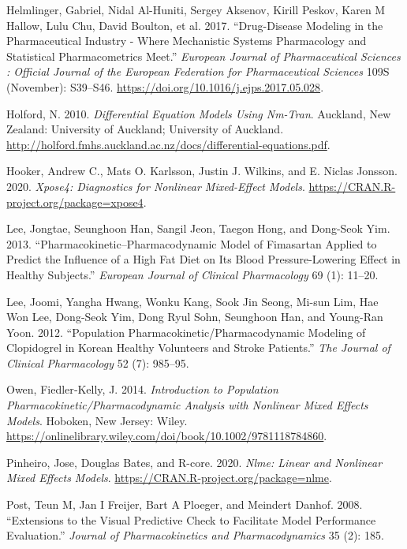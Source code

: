 \documentclass[
  10pt,
  krantz2,
  a4paper]{krantz}
\newlength{\cslhangindent}
\newenvironment{cslreferences}%
  {\setlength{\parindent}{0pt}%
  \everypar{\setlength{\hangindent}{\cslhangindent}}\ignorespaces}%
  {\par}
\theoremstyle{definition}
\theoremstyle{definition}
\theoremstyle{definition}
\theoremstyle{remark}
\begin{document}
\begin{cslreferences}
\leavevmode\hypertarget{ref-helmlinger2017drug}{}%
Helmlinger, Gabriel, Nidal Al-Huniti, Sergey Aksenov, Kirill Peskov, Karen M Hallow, Lulu Chu, David Boulton, et al. 2017. ``Drug-Disease Modeling in the Pharmaceutical Industry - Where Mechanistic Systems Pharmacology and Statistical Pharmacometrics Meet.'' \emph{European Journal of Pharmaceutical Sciences : Official Journal of the European Federation for Pharmaceutical Sciences} 109S (November): S39--S46. \url{https://doi.org/10.1016/j.ejps.2017.05.028}.

\leavevmode\hypertarget{ref-nickholford}{}%
Holford, N. 2010. \emph{Differential Equation Models Using Nm-Tran}. Auckland, New Zealand: University of Auckland; University of Auckland. \url{http://holford.fmhs.auckland.ac.nz/docs/differential-equations.pdf}.

\leavevmode\hypertarget{ref-R-xpose4}{}%
Hooker, Andrew C., Mats O. Karlsson, Justin J. Wilkins, and E. Niclas Jonsson. 2020. \emph{Xpose4: Diagnostics for Nonlinear Mixed-Effect Models}. \url{https://CRAN.R-project.org/package=xpose4}.

\leavevmode\hypertarget{ref-lee2013pharmacokinetic}{}%
Lee, Jongtae, Seunghoon Han, Sangil Jeon, Taegon Hong, and Dong-Seok Yim. 2013. ``Pharmacokinetic--Pharmacodynamic Model of Fimasartan Applied to Predict the Influence of a High Fat Diet on Its Blood Pressure-Lowering Effect in Healthy Subjects.'' \emph{European Journal of Clinical Pharmacology} 69 (1): 11--20.

\leavevmode\hypertarget{ref-lee2012population}{}%
Lee, Joomi, Yangha Hwang, Wonku Kang, Sook Jin Seong, Mi-sun Lim, Hae Won Lee, Dong-Seok Yim, Dong Ryul Sohn, Seunghoon Han, and Young-Ran Yoon. 2012. ``Population Pharmacokinetic/Pharmacodynamic Modeling of Clopidogrel in Korean Healthy Volunteers and Stroke Patients.'' \emph{The Journal of Clinical Pharmacology} 52 (7): 985--95.

\leavevmode\hypertarget{ref-kelly}{}%
Owen, Fiedler‐Kelly, J. 2014. \emph{Introduction to Population Pharmacokinetic/Pharmacodynamic Analysis with Nonlinear Mixed Effects Models}. Hoboken, New Jersey: Wiley. \url{https://onlinelibrary.wiley.com/doi/book/10.1002/9781118784860}.

\leavevmode\hypertarget{ref-R-nlme}{}%
Pinheiro, Jose, Douglas Bates, and R-core. 2020. \emph{Nlme: Linear and Nonlinear Mixed Effects Models}. \url{https://CRAN.R-project.org/package=nlme}.

\leavevmode\hypertarget{ref-post2008extensions}{}%
Post, Teun M, Jan I Freijer, Bart A Ploeger, and Meindert Danhof. 2008. ``Extensions to the Visual Predictive Check to Facilitate Model Performance Evaluation.'' \emph{Journal of Pharmacokinetics and Pharmacodynamics} 35 (2): 185.


\end{cslreferences}
\end{document}
